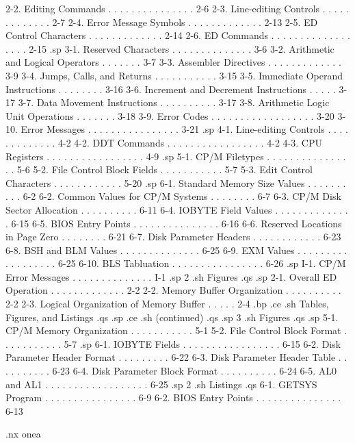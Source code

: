      2-2.   Editing Commands  . . . . . . . . . . . . . . .   2-6
     2-3.   Line-editing Controls . . . . . . . . . . . . .   2-7
     2-4.   Error Message Symbols . . . . . . . . . . . . .  2-13
     2-5.   ED Control Characters . . . . . . . . . . . . .  2-14
     2-6.   ED Commands . . . . . . . . . . . . . . . . . .  2-15
.sp
     3-1.   Reserved Characters . . . . . . . . . . . . . .   3-6
     3-2.   Arithmetic and Logical Operators  . . . . . . .   3-7
     3-3.   Assembler Directives  . . . . . . . . . . . . .   3-9
     3-4.   Jumps, Calls, and Returns . . . . . . . . . . .  3-15
     3-5.   Immediate Operand Instructions  . . . . . . . .  3-16
     3-6.   Increment and Decrement Instructions  . . . . .  3-17
     3-7.   Data Movement Instructions  . . . . . . . . . .  3-17
     3-8.   Arithmetic Logic Unit Operations  . . . . . . .  3-18
     3-9.   Error Codes . . . . . . . . . . . . . . . . . .  3-20
     3-10.  Error Messages  . . . . . . . . . . . . . . . .  3-21
.sp
     4-1.   Line-editing Controls . . . . . . . . . . . . .   4-2
     4-2.   DDT Commands  . . . . . . . . . . . . . . . . .   4-2
     4-3.   CPU Registers . . . . . . . . . . . . . . . . .   4-9
.sp
     5-1.   CP/M Filetypes  . . . . . . . . . . . . . . . .   5-6
     5-2.   File Control Block Fields . . . . . . . . . . .   5-7
     5-3.   Edit Control Characters . . . . . . . . . . . .  5-20
.sp
     6-1.   Standard Memory Size Values . . . . . . . . . .   6-2
     6-2.   Common Values for CP/M Systems  . . . . . . . .   6-7
     6-3.   CP/M Disk Sector Allocation . . . . . . . . . .  6-11
     6-4.   IOBYTE Field Values . . . . . . . . . . . . . .  6-15
     6-5.   BIOS Entry Points . . . . . . . . . . . . . . .  6-16
     6-6.   Reserved Locations in Page Zero . . . . . . . .  6-21
     6-7.   Disk Parameter Headers  . . . . . . . . . . . .  6-23
     6-8.   BSH and BLM Values  . . . . . . . . . . . . . .  6-25
     6-9.   EXM Values  . . . . . . . . . . . . . . . . . .  6-25
     6-10.  BLS Tabluation  . . . . . . . . . . . . . . . .  6-26
.sp
     I-1.   CP/M Error Messages . . . . . . . . . . . . . .   I-1
.sp 2
.sh
Figures
.qs
.sp
     2-1.   Overall ED Operation  . . . . . . . . . . . . .   2-2
     2-2.   Memory Buffer Organization  . . . . . . . . . .   2-2
     2-3.   Logical Organization of Memory Buffer . . . . .   2-4
.bp
.ce
.sh
Tables, Figures, and Listings
.qs
.sp
.ce
.sh
(continued)
.qs
.sp 3
.sh
Figures
.qs
.sp
     5-1.   CP/M Memory Organization  . . . . . . . . . . .   5-1
     5-2.   File Control Block Format . . . . . . . . . . .   5-7
.sp
     6-1.   IOBYTE Fields . . . . . . . . . . . . . . . . .  6-15
     6-2.   Disk Parameter Header Format  . . . . . . . . .  6-22
     6-3.   Disk Parameter Header Table . . . . . . . . . .  6-23
     6-4.   Disk Parameter Block Format . . . . . . . . . .  6-24
     6-5.   AL0 and AL1 . . . . . . . . . . . . . . . . . .  6-25
.sp 2
.sh
Listings
.qs
     6-1.   GETSYS Program  . . . . . . . . . . . . . . . .   6-9
     6-2.   BIOS Entry Points . . . . . . . . . . . . . . .  6-13









.nx onea

